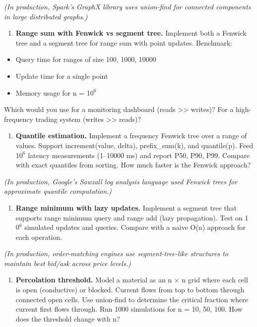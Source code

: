    \textit{(In production, Spark's GraphX library uses union-find for connected components in large distributed graphs.)}

\begin{enumerate}
\item \textbf{Range sum with Fenwick vs segment tree.} Implement both a Fenwick tree and a segment tree for range sum with point updates. Benchmark:
\end{enumerate}
\begin{itemize}
\item Query time for ranges of size 100, 1000, 10000
\item Update time for a single point
\item Memory usage for n = 1$0^{6}$
\end{itemize}
   Which would you use for a monitoring dashboard (reads >> writes)? For a high-frequency trading system (writes >> reads)?

\begin{enumerate}
\item \textbf{Quantile estimation.} Implement a frequency Fenwick tree over a range of values. Support increment(value, delta), prefix\_sum(k), and quantile(p). Feed 1$0^{6}$ latency measurements (1–10000 ms) and report P50, P90, P99. Compare with exact quantiles from sorting. How much faster is the Fenwick approach?
\end{enumerate}

   \textit{(In production, Google's Sawzall log analysis language used Fenwick trees for approximate quantile computation.)}

\begin{enumerate}
\item \textbf{Range minimum with lazy updates.} Implement a segment tree that supports range minimum query and range add (lazy propagation). Test on 1$0^{6}$ simulated updates and queries. Compare with a naive O(n) approach for each operation.
\end{enumerate}

   \textit{(In production, order-matching engines use segment-tree-like structures to maintain best bid/ask across price levels.)}

\begin{enumerate}
\item \textbf{Percolation threshold.} Model a material as an n $\times $ n grid where each cell is open (conductive) or blocked. Current flows from top to bottom through connected open cells. Use union-find to determine the critical fraction where current first flows through. Run 1000 simulations for n = 10, 50, 100. How does the threshold change with n?
\end{enumerate}

